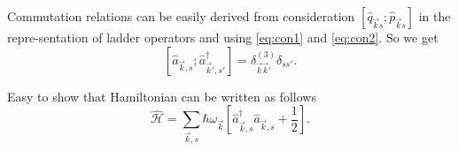 	Commutation relations can be easily derived from consideration $\left[ \hat{q}_{\vec{k}s} ; \hat{p}_{\vec{k}s} \right]$ in the repre-sentation  of ladder operators and using \eqref{eq:con1} and \eqref{eq:con2}. So we get
	\begin{equation}
		\left[ \hat{a}_{\vec{k},s} ; \hat{a}^{\dagger}_{\vec{k}',s'} \right] = \delta^{(3)}_{\vec{k}\vec{k}'} \delta_{ss'}.
	\end{equation}
	
	Easy to  show that Hamiltonian can be written as follows
	\begin{equation}
		\hat{\mathscr{H}} = \sum_{\vec{k},s} \hbar \omega_{\vec{k}} \left[ \hat{a}^{\dagger}_{\vec{k},s} \hat{a}_{\vec{k},s} + \frac{1}{2} \right].
	\end{equation}
	
